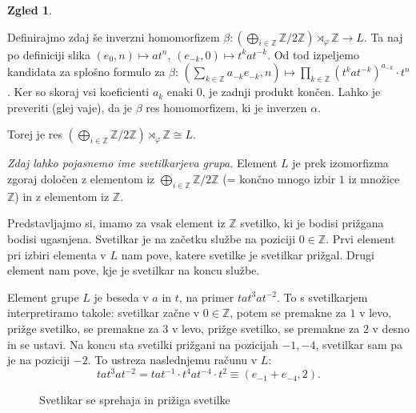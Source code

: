 \documentclass[11pt]{book}
\def\ZZ{\mathbb{Z}}
\def\literatura{\color{modra}}
\def\vaje{{\literatura (glej vaje)}}
\theoremstyle{definition}
\theoremstyle{zgled}
\newtheorem*{zgled}{Zgled}
\theoremstyle{odprtproblem}
\theoremstyle{domacanaloga}
\theoremstyle{izrek}
\begin{document}
\begin{zgled}
\begin{itemize}
    Definirajmo zdaj še inverzni homomorfizem $\beta \colon \left( \bigoplus_{i \in \ZZ} \ZZ/2\ZZ \right) \rtimes_{\varphi} \ZZ \to L$. Ta naj po definiciji slika $(e_0, n) \mapsto a t^n$, $(e_{-k},0) \mapsto t^k a t^{-k}$. Od tod izpeljemo kandidata za splošno formulo za $\beta$: $(\sum_{k \in \ZZ} a_{-k} e_{-k}, n) \mapsto \prod_{k \in \ZZ} (t^k a t^{-k})^{a_{-k}} \cdot t^n$. Ker so skoraj vsi koeficienti $a_k$ enaki $0$, je zadnji produkt končen. Lahko je preveriti \vaje, da je $\beta$ res homomorfizem, ki je inverzen $\alpha$. 

    Torej je res $\left( \bigoplus_{i \in \ZZ} \ZZ/2\ZZ \right) \rtimes_{\varphi} \ZZ \cong L$.

    {\em Zdaj lahko pojasnemo ime svetilkarjeva grupa.} Element $L$ je prek izomorfizma zgoraj določen z elementom iz $\bigoplus_{i \in \ZZ} \ZZ/2\ZZ$ (= končno mnogo izbir $1$ iz množice $\ZZ$) in z elementom iz $\ZZ$. 

    Predstavljajmo si, imamo za vsak element iz $\ZZ$ svetilko, ki je bodisi prižgana bodisi ugasnjena. Svetilkar je na začetku službe na poziciji $0 \in \ZZ$. Prvi element pri izbiri elementa v $L$ nam pove, katere svetilke je svetilkar prižgal. Drugi element nam pove, kje je svetilkar na koncu službe.

    Element grupe $L$ je beseda v $a$ in $t$, na primer $t a t^3 a t^{-2}$. To s svetilkarjem interpretiramo takole: svetilkar začne v $0 \in \ZZ$, potem se premakne za $1$ v levo, prižge svetilko, se premakne za $3$ v levo, prižge svetilko, se premakne za $2$ v desno in se ustavi. Na koncu sta svetilki prižgani na pozicijah $-1, -4$, svetilkar sam pa je na poziciji $-2$. To ustreza naslednjemu računu v $L$:
    \[
    t a t^3 a t^{-2} = t a t^{-1} \cdot t^4 a t^{-4} \cdot t^2 \equiv (e_{-1} + e_{-4}, 2).
    \]
\end{itemize}
\end{zgled}

    \begin{figure}[t]
    \centering
    \caption{Svetlikar se sprehaja in prižiga svetilke}
    \end{figure}
\end{document}
